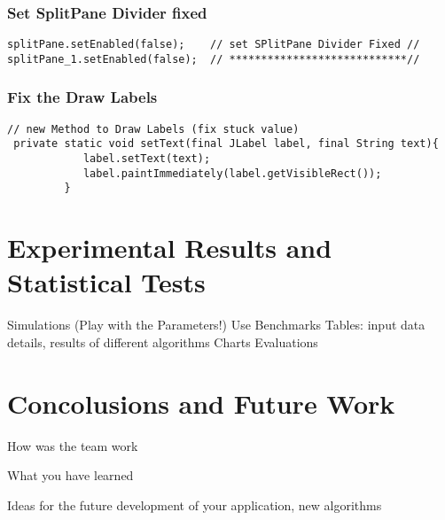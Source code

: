 \documentclass[10pt,a4paper]{article}
\begin{document}
\subsubsection*{Set SplitPane Divider fixed}
\begin{lstlisting}
splitPane.setEnabled(false);	// set SPlitPane Divider Fixed //
splitPane_1.setEnabled(false);	// ****************************//
\end{lstlisting}

\subsubsection{Fix the Draw Labels}
\begin{lstlisting}
// new Method to Draw Labels (fix stuck value)
 private static void setText(final JLabel label, final String text){
            label.setText(text);
            label.paintImmediately(label.getVisibleRect());
         }
\end{lstlisting}



\section{Experimental Results and Statistical Tests}

Simulations (Play with the Parameters!)
Use Benchmarks  
Tables: input data details, results of different algorithms
Charts
Evaluations

\section{Concolusions and Future Work}
How was the team work

What you have learned

Ideas for the future development of your application, new algorithms
\end{document}

